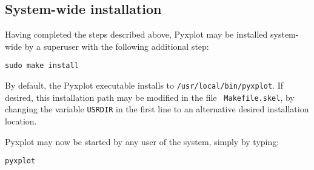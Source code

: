 \subsection{System-wide installation}

Having completed the steps described above, Pyxplot may be installed
system-wide by a superuser with the following additional
step:

\begin{verbatim}
sudo make install
\end{verbatim}

By default, the Pyxplot executable installs to {\tt /usr/local/bin/pyxplot}.
If desired, this installation path may be modified in the file {\tt
Makefile.skel}, by changing the variable {\tt USRDIR} in the first line to an
alternative desired installation location.

Pyxplot may now be started by any user of the system, simply by typing:

\begin{verbatim}
pyxplot
\end{verbatim}


